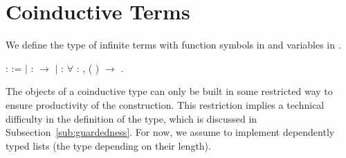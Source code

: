 \section{Coinductive Terms}\label{sec:terms}

We define the type
 of infinite terms with
function symbols in  and variables in .
\begin{singlespace}
\begin{coqdoccode}
\coqdocnoindent
{}  :
 :=\coqdoceol
\coqdocindent{1.00em}
\ensuremath{|}  : 
\ensuremath{\rightarrow} \coqdoceol
\coqdocindent{1.00em}
\ensuremath{|}  :
\ensuremath{\forall}  : ,
( )
\ensuremath{\rightarrow} .\coqdoceol
\end{coqdoccode}
\end{singlespace}
The objects of a coinductive type can only be built in some restricted way to
ensure productivity of the construction. This restriction implies a technical
difficulty in the definition of the
 type, which is discussed in
Subsection~\ref{sub:guardedness}.
For now, we assume  to
implement dependently typed lists (the type depending on their length).

